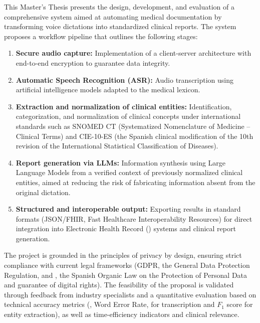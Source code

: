 
This Master's Thesis presents the design, development, and evaluation of a comprehensive 
system aimed at automating medical documentation by transforming voice dictations 
into standardized clinical reports. 
The system proposes a workflow pipeline that outlines the following stages:
\begin{enumerate}
    \setlength{\itemsep}{1pt}
    \setlength{\parsep}{0pt}
    \setlength{\topsep}{4pt}
    \item \textbf{Secure audio capture:} 
        Implementation of a client-server architecture with end-to-end encryption 
        to guarantee data integrity.
    \item \textbf{Automatic Speech Recognition (ASR):} 
        Audio transcription using artificial intelligence models adapted to the 
        medical lexicon.
    \item \textbf{Extraction and normalization of clinical entities:}
        Identification, categorization, and normalization of clinical concepts under
        international standards such as SNOMED CT (Systematized Nomenclature of Medicine --
        Clinical Terms) and CIE-10-ES (the Spanish clinical modification of the 10th revision
        of the International Statistical Classification of Diseases).
    \item \textbf{Report generation via LLMs:}
        Information synthesis using Large Language Models from a verified context of
        previously normalized clinical entities, aimed at reducing the risk of fabricating
        information absent from the original dictation.
    \item \textbf{Structured and interoperable output:}
        Exporting results in standard formats (JSON/FHIR, Fast Healthcare Interoperability
        Resources) for direct integration
        into Electronic Health Record () systems and clinical report generation.
\end{enumerate}

The project is grounded in the principles of privacy by design, ensuring strict
compliance with current legal frameworks (GDPR, the General Data Protection Regulation, and
, the Spanish Organic Law on the Protection of Personal Data and guarantee
of digital rights).
The feasibility of the proposal is validated through feedback from industry
specialists and a quantitative evaluation based on technical accuracy metrics
(, Word Error Rate, for transcription and $F_1$ score for entity extraction),
as well as time-efficiency indicators and clinical relevance.